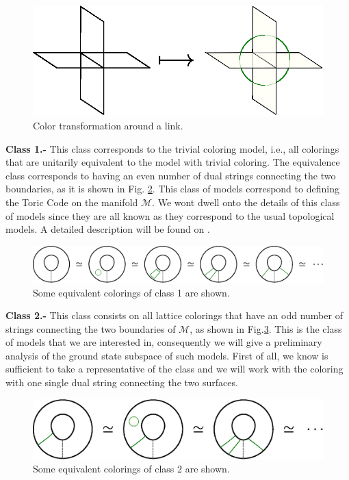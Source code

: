 \documentclass[%
nofootinbib,
 amsmath,amssymb,
aps,
]{revtex4-1}
\theoremstyle{plain}%
\theoremstyle{definition}
\theoremstyle{remark}
\begin{document}
\begin{figure}[h!]
\centering
\includegraphics[scale=0.6]{coltrans.eps}
\caption{\label{fig:coltrans}Color transformation around a link.}
\end{figure}

\textbf{Class 1.-} This class corresponds to the trivial coloring model, i.e., all colorings that are unitarily equivalent to the model with trivial coloring. The equivalence class corresponds to having an even number of dual strings connecting the two boundaries, as it is shown in Fig. \ref{fig:class1}. This class of models correspond to defining the Toric Code on the manifold \(\mathcal{M}\). We wont dwell onto the details of this class of models since they are all known as they correspond to the usual topological models. A detailed description will be found on \cite{pablo}.
\begin{figure}[h!]
\centering
\includegraphics[scale=0.55]{class1.eps}
\caption{\label{fig:class1}Some equivalent colorings of class 1 are shown.}
\end{figure}

\textbf{Class 2.-} This class consists on all lattice colorings that have an odd number of strings connecting the two boundaries of \(\mathcal{M}\), as shown in Fig.\ref{fig:class2}. This is the class of models that we are interested in, consequently we will give a preliminary analysis of the ground state subspace of such models. First of all, we know is sufficient to take a representative of the class and we will work with the coloring with one single dual string connecting the two surfaces.
\begin{figure}[h!]
\centering
\includegraphics[scale=0.55]{class2.eps}
\caption{\label{fig:class2}Some equivalent colorings of class 2 are shown.}
\end{figure}
\end{document}
